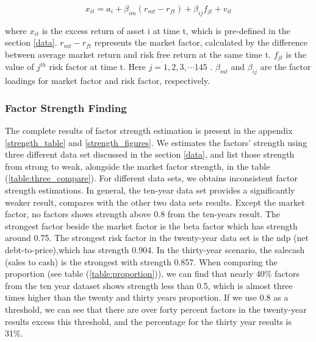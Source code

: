 \[  x_{it} = a_i + \beta_{im}(r_{mt} - r_{ft}) + \beta_{ij}f_{jt} + v_{it}  \]

where $x_{it}$ is the excess return of asset i at time t, which is pre-defined in the section \ref{data}.
$r_{mt} - r_{ft}$ represents the market factor, calculated by the difference between average market return and risk free return at the same time t.
$f_{jt}$ is the value of $j^{th}$ risk factor  at time t. 
Here $j = 1, 2, 3,\cdots 145$ . 
$\beta_{mt}$ and $\beta_{ij}$ are the factor loadings for market factor and risk factor, respectively.

	\subsubsection{Factor Strength Finding}
The complete results of factor strength estimation is present in the appendix \ref{strength_table} and \ref{strength_figures}.
We estimates the factors' strength using three different data set discussed in the section \ref{data}, and list those strength from strong to weak, alongside the market factor strength, in the table (\ref{table:three_compare}).
For different data sets, we obtains inconsistent factor strength estimations.
In general, the ten-year data set provides a significantly weaker result, compares with the other two data sets results.
Except the market factor, no factors shows strength above 0.8 from the ten-years result.
The strongest factor beside the market factor is the beta factor which has strength around 0.75.
The strongest risk factor in the twenty-year data set is the ndp (net debt-to-price),which has strength 0.904.
In the thirty-year scenario, the salecash (sales to cash) is the strongest with strength 0.857.
When comparing the proportion (see table (\ref{table:proportion})), we can find that nearly 40\% factors from the ten year dataset shows strength less than 0.5, which is almost three times higher than the twenty and thirty years proportion.
If we use 0.8 as a threshold, we can see that there are over forty percent factors in the twenty-year results excess this threshold, and the percentage for the thirty year results is 31\%.

